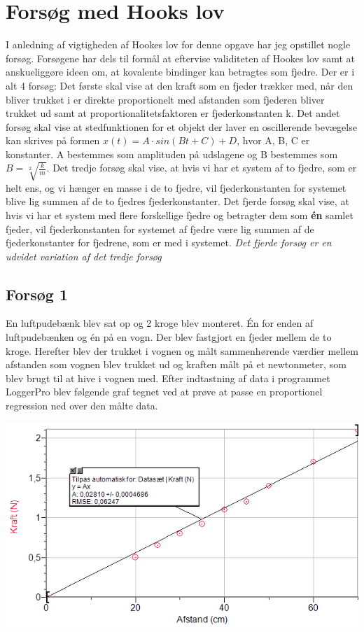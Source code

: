 \section{Forsøg med Hooks lov}
I anledning af vigtigheden af Hookes lov for denne opgave har jeg opstillet nogle forsøg. Forsøgene har dels til formål at eftervise validiteten af Hookes lov samt at anskueliggøre ideen om, at kovalente bindinger kan betragtes som fjedre. Der er i alt 4 forsøg: Det første skal vise at den kraft som en fjeder trækker med, når den bliver trukket i er direkte proportionelt med afstanden som fjederen bliver trukket ud samt at proportionalitetsfaktoren er fjederkonstanten k. Det andet forsøg skal vise at stedfunktionen for et objekt der laver en oscillerende bevægelse kan skrives på formen $x(t) = A \cdot sin(B t + C) + D$, hvor A, B, C er konstanter. A bestemmes som amplituden på udslagene og B bestemmes som $B=\sqrt[2]{\frac{k}{m}}$. Det tredje forsøg skal vise, at hvis vi har et system af to fjedre, som er helt ens, og vi hænger en masse i de to fjedre, vil fjederkonstanten for systemet blive lig summen af de to fjedres fjederkonstanter. Det fjerde forsøg skal vise, at hvis vi har et system med flere forskellige fjedre og betragter dem som \textbf{én} samlet fjeder, vil fjederkonstanten for systemet af fjedre være lig summen af de fjederkonstanter for fjedrene, som er med i systemet. \emph{Det fjerde forsøg er en udvidet variation af det tredje forsøg}

\subsection{Forsøg 1}
En luftpudebænk blev sat op og 2 kroge blev monteret. Én for enden af luftpudebænken og én på en vogn. Der blev fastgjort en fjeder mellem de to kroge. Herefter blev der trukket i vognen og målt sammenhørende værdier mellem afstanden som vognen blev trukket ud og kraften målt på et newtonmeter, som blev brugt til at hive i vognen med. Efter indtastning af data i programmet LoggerPro blev følgende graf tegnet ved at prøve at passe en proportionel regression ned over den målte data. 

\begin{center}
\includegraphics[scale=0.7]{Billeder/graf1}
\end{center}

